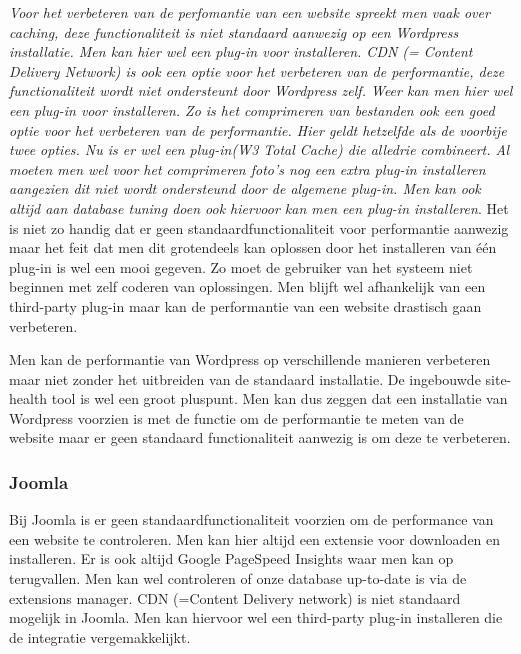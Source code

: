 \textit{Voor het verbeteren van de perfomantie van een website spreekt men vaak over caching, deze functionaliteit is niet standaard aanwezig op een Wordpress installatie. Men kan hier wel een plug-in voor installeren. CDN (= Content Delivery Network) is ook een optie voor het verbeteren van de performantie, deze functionaliteit wordt niet ondersteunt door Wordpress zelf. Weer kan men hier wel een plug-in voor installeren. Zo is het comprimeren van bestanden ook een goed optie voor het verbeteren van de performantie. Hier geldt hetzelfde als de voorbije twee opties. Nu is er wel een plug-in(W3 Total Cache) die alledrie combineert. Al moeten men wel voor het comprimeren foto's nog een extra plug-in installeren aangezien dit niet wordt ondersteund door de algemene plug-in. Men kan ook altijd aan database tuning doen ook hiervoor kan men een plug-in installeren}.\autocite{WordpressCommunity2019b} Het is niet zo handig dat er geen standaardfunctionaliteit voor performantie aanwezig maar het feit dat men dit grotendeels kan oplossen door het installeren van één plug-in is wel een mooi gegeven. Zo moet de gebruiker van het systeem niet beginnen met zelf coderen van oplossingen. Men blijft wel afhankelijk van een third-party plug-in maar kan de performantie van een website drastisch gaan verbeteren.

Men kan de performantie van Wordpress op verschillende manieren verbeteren maar niet zonder het uitbreiden van de standaard installatie. De ingebouwde site-health tool is wel een groot pluspunt. Men kan dus zeggen dat een installatie van Wordpress voorzien is met de functie om de performantie te meten van de website maar er geen standaard functionaliteit aanwezig is om deze te verbeteren.

\subsubsection{Joomla}
Bij Joomla is er geen standaardfunctionaliteit voorzien om de performance van een website te controleren. Men kan hier altijd een extensie voor downloaden en installeren. Er is ook altijd Google PageSpeed Insights waar men kan op terugvallen. Men kan wel controleren of onze database up-to-date is via de extensions manager. CDN (=Content Delivery network) is niet standaard mogelijk in Joomla. Men kan hiervoor wel een third-party plug-in installeren die de integratie vergemakkelijkt.

